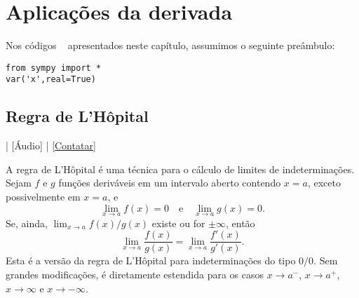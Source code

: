 
\chapter{Aplicações da derivada}\label{cap_apderiv}

\ifispython
\begin{obs}\label{obs:cap_apderiv_python}
  Nos códigos \sympy~ apresentados neste capítulo, assumimos o seguinte preâmbulo:
\begin{verbatim}
from sympy import *
var('x',real=True)
\end{verbatim}
\end{obs}
\fi

\section{Regra de L'Hôpital}\label{cap_apderiv_sec_lhospital}

\begin{flushright}
  [Vídeo] | [Áudio] | \href{https://phkonzen.github.io/notas/contato.html}{[Contatar]}
\end{flushright}

A regra de L'Hôpital é uma técnica para o cálculo de limites de indeterminações. Sejam $f$ e $g$ funções deriváveis em um intervalo aberto contendo $x=a$, exceto possivelmente em $x=a$, e
\begin{equation}
  \lim_{x\to a} f(x) = 0\quad\text{e}\quad\lim_{x\to a} g(x) = 0.
\end{equation}
Se, ainda, $\lim_{x\to a} f(x)/g(x)$ existe ou for $\pm\infty$, então
\begin{equation}
  \lim_{x\to a} \frac{f(x)}{g(x)} = \lim_{x\to a} \frac{f'(x)}{g'(x)}.
\end{equation}
Esta é a versão da regra de L'Hôpital para indeterminações do tipo $0/0$. Sem grandes modificações, é diretamente estendida para os casos $x\to a^-$, $x\to a^+$, $x\to \infty$ e $x\to -\infty$.

